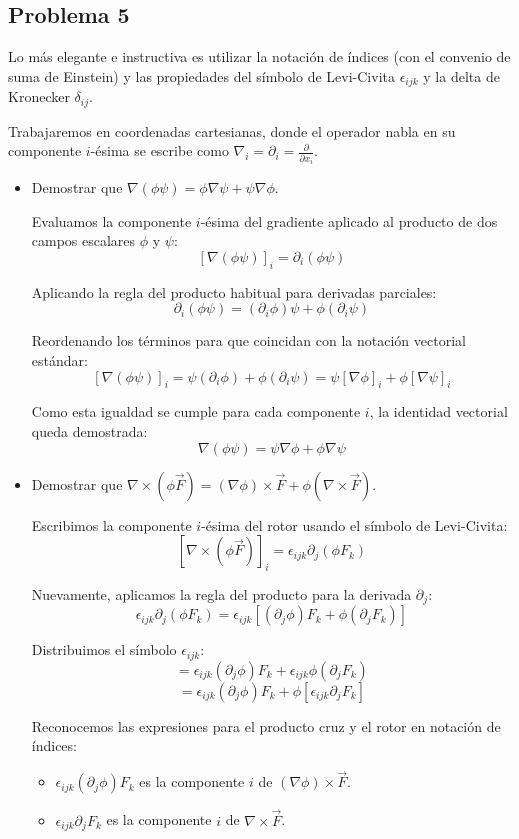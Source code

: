 \documentclass[11pt,spanish]{article}
\begin{document}
\subsection*{Problema 5}

Lo más elegante e instructiva es utilizar la notación de índices (con el convenio de suma de Einstein) y las propiedades del símbolo de Levi-Civita $\epsilon_{ijk}$ y la delta de Kronecker $\delta_{ij}$.

Trabajaremos en coordenadas cartesianas, donde el operador nabla en su componente $i$-ésima se escribe como $\nabla_i = \partial_i = \frac{\partial}{\partial x_i}$.

\begin{itemize}
\item[a)] Demostrar que $\nabla(\phi\psi) = \phi\nabla\psi + \psi\nabla\phi$.

Evaluamos la componente $i$-ésima del gradiente aplicado al producto de dos campos escalares $\phi$ y $\psi$:
$$[\nabla(\phi\psi)]_i = \partial_i (\phi\psi)$$

Aplicando la regla del producto habitual para derivadas parciales:
$$\partial_i (\phi\psi) = (\partial_i \phi)\psi + \phi(\partial_i \psi)$$

Reordenando los términos para que coincidan con la notación vectorial estándar:
$$[\nabla(\phi\psi)]_i = \psi (\partial_i \phi) + \phi (\partial_i \psi) = \psi [\nabla\phi]_i + \phi [\nabla\psi]_i$$

Como esta igualdad se cumple para cada componente $i$, la identidad vectorial queda demostrada:
$$\nabla(\phi\psi) = \psi\nabla\phi + \phi\nabla\psi$$

\item[b)] Demostrar que $\nabla \times (\phi\vec{F}) = (\nabla\phi) \times \vec{F} + \phi(\nabla \times \vec{F})$.

Escribimos la componente $i$-ésima del rotor usando el símbolo de Levi-Civita:
$$[\nabla \times (\phi\vec{F})]_i = \epsilon_{ijk} \partial_j (\phi F_k)$$

Nuevamente, aplicamos la regla del producto para la derivada $\partial_j$:
$$\epsilon_{ijk} \partial_j (\phi F_k) = \epsilon_{ijk} [(\partial_j \phi) F_k + \phi (\partial_j F_k)]$$

Distribuimos el símbolo $\epsilon_{ijk}$:
$$= \epsilon_{ijk} (\partial_j \phi) F_k + \epsilon_{ijk} \phi (\partial_j F_k)$$
$$= \epsilon_{ijk} (\partial_j \phi) F_k + \phi [\epsilon_{ijk} \partial_j F_k]$$

Reconocemos las expresiones para el producto cruz y el rotor en notación de índices:
\begin{itemize}
\item $\epsilon_{ijk} (\partial_j \phi) F_k$ es la componente $i$ de $(\nabla\phi) \times \vec{F}$.
\item $\epsilon_{ijk} \partial_j F_k$ es la componente $i$ de $\nabla \times \vec{F}$.
\end{itemize}


\end{itemize}
\end{document}
